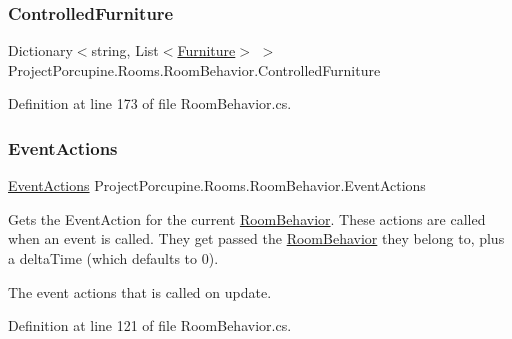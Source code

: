 \subsubsection{\texorpdfstring{Controlled\+Furniture}{ControlledFurniture}}
{\footnotesize\ttfamily Dictionary$<$string, List$<$\hyperlink{class_furniture}{Furniture}$>$ $>$ Project\+Porcupine.\+Rooms.\+Room\+Behavior.\+Controlled\+Furniture\hspace{0.3cm}{\ttfamily [get]}}



Definition at line 173 of file Room\+Behavior.\+cs.

\mbox{\label{class_project_porcupine_1_1_rooms_1_1_room_behavior_a0f890f9fdbf836d50cbc6e2ea8f8aaec}} 
\subsubsection{\texorpdfstring{Event\+Actions}{EventActions}}
{\footnotesize\ttfamily \hyperlink{class_event_actions}{Event\+Actions} Project\+Porcupine.\+Rooms.\+Room\+Behavior.\+Event\+Actions\hspace{0.3cm}{\ttfamily [get]}}



Gets the Event\+Action for the current \hyperlink{class_project_porcupine_1_1_rooms_1_1_room_behavior}{Room\+Behavior}. These actions are called when an event is called. They get passed the \hyperlink{class_project_porcupine_1_1_rooms_1_1_room_behavior}{Room\+Behavior} they belong to, plus a delta\+Time (which defaults to 0). 

The event actions that is called on update.

Definition at line 121 of file Room\+Behavior.\+cs.

\mbox{\label{class_project_porcupine_1_1_rooms_1_1_room_behavior_a036e3155df45c58acefa7ef0d41e394f}} 
